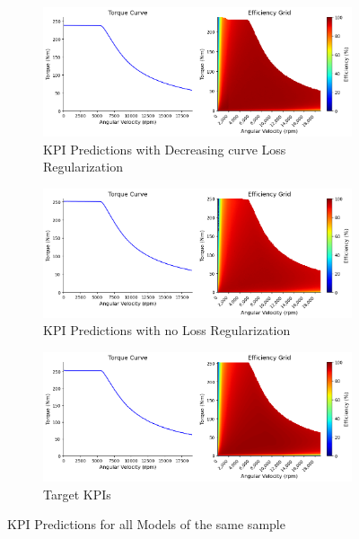 \documentclass{report} %
\begin{document}
\begin{figure}[H]\ContinuedFloat
    \centering
    \begin{subfigure}{1\textwidth}
        \centering
        \includegraphics[width=1\textwidth]{./ReportImages/predictions_Decreasing.png} 
        \caption{KPI Predictions with Decreasing curve Loss Regularization} 
        \label{KPI_Predictions_with_Decreasing}
    \end{subfigure}\hfill
    \begin{subfigure}{1\textwidth}
        \centering
        \includegraphics[width=1\textwidth]{./ReportImages/predictions_no_lossreg.png} 
        \caption{KPI Predictions with no Loss Regularization} 
        \label{KPI_Predictions_with_No_Loss}
    \end{subfigure}\hfill
    \begin{subfigure}{1\textwidth}
        \centering
        \includegraphics[width=1\textwidth]{./ReportImages/predictions_groundtruth.png} 
        \caption{Target KPIs} 
        \label{Target KPIs}
    \end{subfigure}\hfill
    \caption{KPI Predictions for all Models of the same sample}
    \label{fig:KPI Predictions for all Models for the same sample}
\end{figure}
\end{document}

